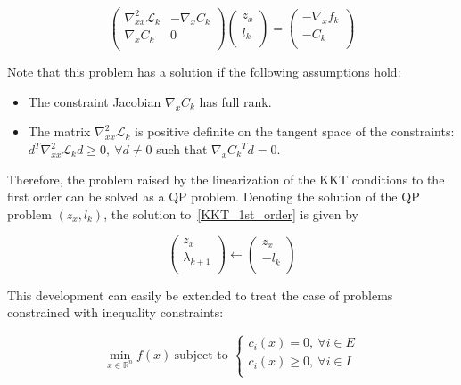 \begin{equation}
  \begin{pmatrix}
      \nabla_{xx}^2\mathcal{L}_k & -\nabla_x C_k\\
      \nabla_x C_k & 0\\
  \end{pmatrix}
  \begin{pmatrix}
      z_x\\
      l_k\\
  \end{pmatrix}
  =
  \begin{pmatrix}
      - \nabla_{x}f_k\\
      - C_k\\
  \end{pmatrix}
\end{equation}

Note that this problem has a solution if the following assumptions hold:
\begin{itemize}
  \item The constraint Jacobian $\nabla_x C_k$ has full rank.
  \item The matrix $\nabla_{xx}^2\mathcal{L}_k$ is positive definite on the tangent space of the constraints:\\ $d^T\nabla_{xx}^2\mathcal{L}_k d \geq 0,\ \forall d\neq 0$ such that ${\nabla_x C_k}^T d = 0$.
\end{itemize}

Therefore, the problem raised by the linearization of the KKT conditions to the first order can be solved as a QP problem.
Denoting the solution of the QP problem $(z_x, l_k)$, the solution to~\ref{KKT_1st_order} is given by

\begin{equation}
  \begin{pmatrix}
      z_x\\
      \lambda_{k+1}\\
  \end{pmatrix}
  \leftarrow
  \begin{pmatrix}
      z_x\\
      -l_k\\
  \end{pmatrix}
\end{equation}

This development can easily be extended to treat the case of problems constrained with inequality constraints:

\begin{equation}
  \min_{x\in\mathbb{R}^n}{f(x)}\ \text{subject to }
  \left\{
  \begin{array}{l}
    c_i(x) = 0,\ \forall i\in{E}\\
    c_i(x) \geq 0,\ \forall i\in{I}\\
  \end{array}
  \right.
\end{equation}

